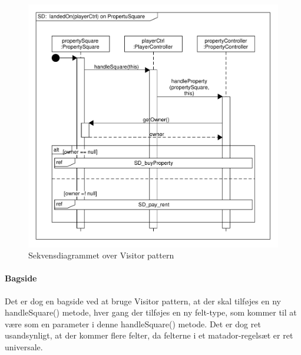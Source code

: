 \documentclass[class=article, crop=false]{standalone}
\begin{document}
        \begin{figure}[H]
        \centering

        \hbox{\hspace{-1cm}\includegraphics[scale=0.6]{diagrams/SD_landed_on.pdf}}
        \caption{Sekvensdiagrammet over Visitor pattern}\label{fig:SD_landed_on}
    \end{figure}

       \paragraph{Bagside \newline}
        Det er dog en bagside ved at bruge Visitor pattern, at der skal tilføjes en ny handleSquare() metode, hver gang der tilføjes en ny felt-type, som kommer til at være som en parameter i denne handleSquare() metode. Det er dog ret usandsynligt, at der kommer flere felter, da felterne i et matador-regelsæt er ret universale.
\end{document}
